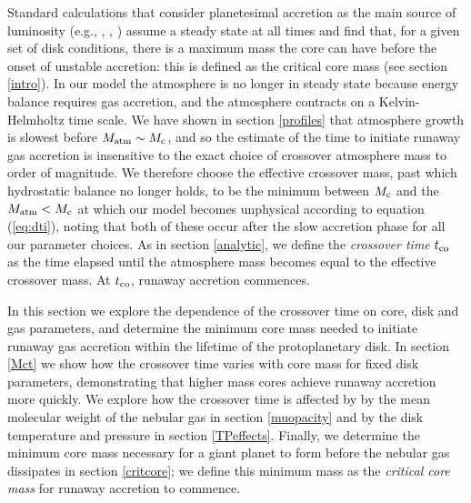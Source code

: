 \documentclass[apj]{emulateapj}
\begin{document}


Standard calculations that consider planetesimal accretion as the main source of luminosity (e.g., \citealt{mizuno78}, \citealt{stevenson82}, \citealt{rafikov06}) assume a steady state at all times and find that, for a given set of disk conditions, there is a maximum mass the core can have before the onset of unstable accretion: this is defined as the critical core mass (see section \ref{intro}). In our model the atmosphere is no longer in steady state because energy balance requires gas accretion, and the atmosphere contracts on a Kelvin-Helmholtz time scale. We have shown in section \ref{profiles} that atmosphere growth is slowest before $M_{\rm{atm}} \sim M_{\rm c}$, and so the estimate of the time to initiate runaway gas accretion is insensitive to the exact choice of crossover atmosphere mass to order of magnitude. We therefore choose the effective crossover mass, past which hydrostatic balance no longer holds, to be the minimum between $M_{\rm{c}}$ and the $M_{\rm{atm}}<M_{\rm c}$ at which our model becomes unphysical according to equation (\ref{eq:dti}), noting that both of these occur after the slow accretion phase for all our parameter choices. As in section \ref{analytic}, we define the \textit{crossover time} $t_{\rm{co}}$ as the time elapsed until the atmosphere mass becomes equal to the effective crossover mass. At $t_{\rm{co}}$, runaway accretion commences.

In this section we explore the dependence of the crossover time on core, disk and gas parameters, and determine the minimum core mass needed to initiate runaway gas accretion within the lifetime of the protoplanetary disk. In section \ref{Mct} we show how the crossover time varies with core mass for fixed disk parameters, demonstrating that higher mass cores achieve runaway accretion more quickly. We explore how the crossover time is affected by by the mean molecular weight of the nebular gas in section \ref{muopacity} and by the disk temperature and pressure in section \ref{TPeffects}. Finally, we determine the minimum core mass necessary for a giant planet to form before the nebular gas dissipates in section \ref{critcore}; we define this minimum mass as the \textit{critical core mass} for runaway accretion to commence. 
\end{document}
